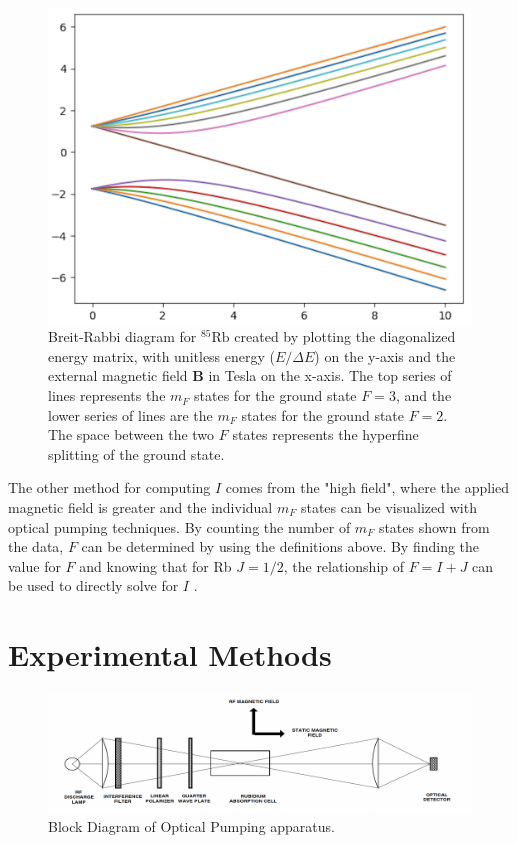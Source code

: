 \documentclass[
 reprint,
linenumbers,
aps,amsmath
]{revtex4-2}
\begin{document}
\begin{figure} [h]
    \centering
    \includegraphics[width=1 \linewidth]{Images/Rb 85 BRD 2.png}
    \caption{Breit-Rabbi diagram for $^{85}\mathrm{Rb}$ created by plotting the diagonalized energy matrix, with unitless energy ($E/\Delta E$) on the y-axis and the external magnetic field $\mathbf{B}$ in Tesla on the x-axis. The top series of lines represents the $m_F$ states for the ground state $F=3$, and the lower series of lines are the $m_F$ states for the ground state $F=2$. The space between the two $F$ states represents the hyperfine splitting of the ground state.}
    \label{Rb 85 BRD}
\end{figure}

The other method for computing $I$ comes from the "high field", where the applied magnetic field is greater and the individual $m_F$ states can be visualized with optical pumping techniques. By counting the number of $m_F$ states shown from the data, $F$ can be determined by using the definitions above. By finding the value for $F$ and knowing that for Rb $J=1/2$, the relationship of $F=I+J$ can be used to directly solve for $I$ \cite{melissinos-mod-phys}.

\section{Experimental Methods} \label{methods}

\begin{figure}
    \centering
    \includegraphics[width=1 \linewidth]{Images/Block Diagram.png}
    \caption{Block Diagram of Optical Pumping apparatus.}
    \label{Block Diagram}
\end{figure}
\end{document}
